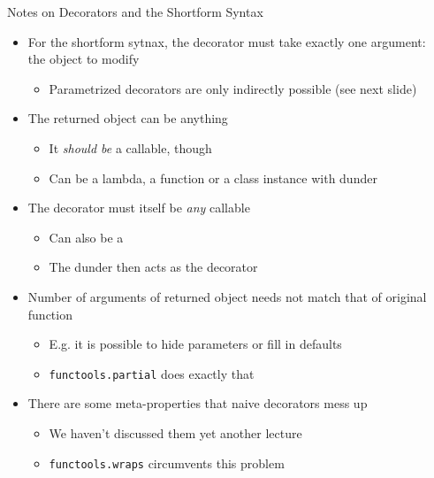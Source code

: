 \begin{frame}[fragile]{Notes on Decorators and the Shortform Syntax}
%
\begin{itemize}
\item For the shortform sytnax, the decorator must take exactly one argument:\\
	the object to modify
	\begin{itemize}
	\item Parametrized decorators are only indirectly possible (see next slide)
	\end{itemize}
\item The returned object can be anything
	\begin{itemize}
	\item It \emph{should be} a callable, though
	\item Can be a lambda, a function or a class instance with dunder 
	\end{itemize}
\item The decorator must itself be \emph{any} callable
	\begin{itemize}
	\item Can also be a 
	\item The dunder  then acts as the decorator
	\end{itemize}
\item Number of arguments of returned object needs not match that of original function
	\begin{itemize}
	\item E.\;g. it is possible to hide parameters or fill in defaults
	\item \texttt{functools.partial} does exactly that
	\end{itemize}
\item There are some meta-properties that naive decorators mess up
	\begin{itemize}
	\item We haven't discussed them yet \Thus another lecture
	\item \texttt{functools.wraps} circumvents this problem
	\end{itemize}
\end{itemize}
%
\end{frame}


